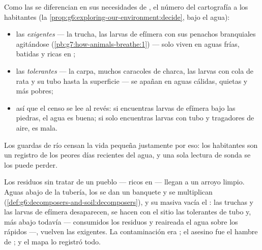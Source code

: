 \begin{proposition}\label{prop:g7:oxygen-in-the-water:map}
Como las  se diferencian en sus necesidades de , el
número del  cartografía a los habitantes (la
\cref{prop:g6:exploring-our-environment:decide}, bajo el agua):
\begin{itemize}
  \item las  \emph{exigentes} --- la trucha, las larvas de
        efímera con sus penachos branquiales agitándose
        (\cref{pb:g7:how-animals-breathe:1}) --- solo viven en aguas
        frías, batidas y ricas en ;
  \item las  \emph{tolerantes} --- la carpa, muchos caracoles
        de charca, las larvas con cola de rata y su tubo hasta la
        superficie --- se apañan en aguas cálidas, quietas y más pobres;
  \item así que el censo se lee al revés: si encuentras larvas de
        efímera bajo las piedras, el agua es buena; si solo encuentras
        larvas con tubo y tragadores de aire, es mala.
\end{itemize}
Los guardas de río censan la vida pequeña justamente por eso: los
habitantes son un registro de los peores días recientes del agua, y una
sola lectura de sonda se los puede perder.
\end{proposition}
\admitted

\begin{example}\label{ex:g7:oxygen-in-the-water:waste}
Los residuos sin tratar de un pueblo --- ricos en  ---
llegan a un arroyo limpio. Aguas abajo de la tubería, los
 se dan un banquete y se multiplican
(\cref{def:g6:decomposers-and-soil:decomposers}), y su 
masiva vacía el : las truchas y las larvas de efímera
desaparecen, se hacen con el sitio las tolerantes de tubo y, más abajo
todavía --- consumidos los residuos y reaireada el agua sobre los
rápidos ---, vuelven las  exigentes. La contaminación era
; el asesino fue el hambre de ; y el mapa lo
registró todo.
\end{example}

